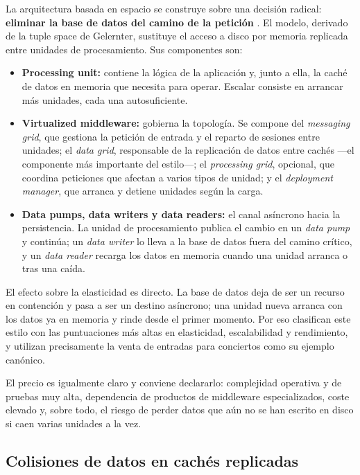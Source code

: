 La arquitectura basada en espacio se construye sobre una decisión radical: \textbf{eliminar la base de datos del camino de la petición} \parencite{richardsford2020}. El modelo, derivado de la tuple space de Gelernter, sustituye el acceso a disco por memoria replicada entre unidades de procesamiento. Sus componentes son:

\begin{itemize}[leftmargin=1.5em]
  \item \textbf{Processing unit:} contiene la lógica de la aplicación y, junto a ella, la caché de datos en memoria que necesita para operar. Escalar consiste en arrancar más unidades, cada una autosuficiente.
  \item \textbf{Virtualized middleware:} gobierna la topología. Se compone del \emph{messaging grid}, que gestiona la petición de entrada y el reparto de sesiones entre unidades; el \emph{data grid}, responsable de la replicación de datos entre cachés ---el componente más importante del estilo---; el \emph{processing grid}, opcional, que coordina peticiones que afectan a varios tipos de unidad; y el \emph{deployment manager}, que arranca y detiene unidades según la carga.
  \item \textbf{Data pumps, data writers y data readers:} el canal asíncrono hacia la persistencia. La unidad de procesamiento publica el cambio en un \emph{data pump} y continúa; un \emph{data writer} lo lleva a la base de datos fuera del camino crítico, y un \emph{data reader} recarga los datos en memoria cuando una unidad arranca o tras una caída.
\end{itemize}

El efecto sobre la elasticidad es directo. La base de datos deja de ser un recurso en contención y pasa a ser un destino asíncrono; una unidad nueva arranca con los datos ya en memoria y rinde desde el primer momento. Por eso \textcite{richardsford2020} clasifican este estilo con las puntuaciones más altas en elasticidad, escalabilidad y rendimiento, y utilizan precisamente la venta de entradas para conciertos como su ejemplo canónico.

El precio es igualmente claro y conviene declararlo: complejidad operativa y de pruebas muy alta, dependencia de productos de middleware especializados, coste elevado y, sobre todo, el riesgo de perder datos que aún no se han escrito en disco si caen varias unidades a la vez.

\subsection{Colisiones de datos en cachés replicadas}

